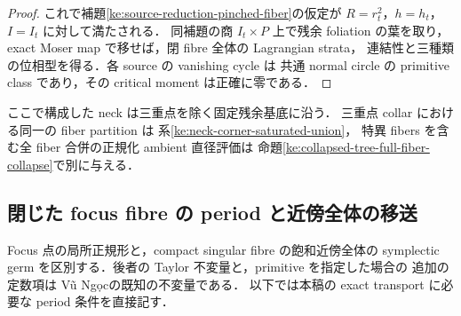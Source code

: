 \begin{proof}
これで補題\ref{ke:source-reduction-pinched-fiber}の仮定が
$R=r_t^2$，$h=h_t$，$I=I_t$ に対して満たされる．
同補題の商 $I_t\times P$ 上で残余 foliation の葉を取り，
exact Moser map で移せば，閉 fibre 全体の Lagrangian strata，
連結性と三種類の位相型を得る．各 source の vanishing cycle は
共通 normal circle の primitive class であり，その critical moment は正確に零である．
\end{proof}

ここで構成した neck は三重点を除く固定残余基底に沿う．
三重点 collar における同一の fiber partition は
系\ref{ke:neck-corner-saturated-union}，
特異 fibers を含む全 fiber 合併の正規化 ambient 直径評価は
命題\ref{ke:collapsed-tree-full-fiber-collapse}で別に与える．

\subsection{閉じた focus fibre の period と近傍全体の移送}

Focus 点の局所正規形と，compact singular fibre の飽和近傍全体の
symplectic germ を区別する．後者の Taylor 不変量と，primitive を指定した場合の
追加の定数項は V\~u Ng\d{o}c\cite[\S\S3, 7]{VuNgoc}の既知の不変量である．
以下では本稿の exact transport に必要な period 条件を直接記す．

